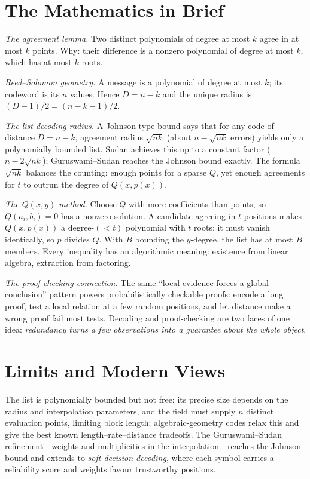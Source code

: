 \section{The Mathematics in Brief}

\emph{The agreement lemma.} Two distinct polynomials of degree at most $k$ agree in at most $k$ points. Why: their difference is a nonzero polynomial of degree at most $k$, which has at most $k$ roots.

\emph{Reed--Solomon geometry.} A message is a polynomial of degree at most $k$; its codeword is its $n$ values. Hence $D=n-k$ and the unique radius is $(D-1)/2=(n-k-1)/2$.

\emph{The list-decoding radius.} A Johnson-type bound says that for any code of distance $D=n-k$, agreement radius $\sqrt{nk}$ (about $n-\sqrt{nk}$ errors) yields only a polynomially bounded list. Sudan achieves this up to a constant factor ($n-2\sqrt{nk}$); Guruswami--Sudan reaches the Johnson bound exactly. The formula $\sqrt{nk}$ balances the counting: enough points for a sparse $Q$, yet enough agreements for $t$ to outrun the degree of $Q(x,p(x))$.

\emph{The $Q(x,y)$ method.} Choose $Q$ with more coefficients than points, so $Q(a_i,b_i)=0$ has a nonzero solution. A candidate agreeing in $t$ positions makes $Q(x,p(x))$ a degree-$(<t)$ polynomial with $t$ roots; it must vanish identically, so $p$ divides $Q$. With $B$ bounding the $y$-degree, the list has at most $B$ members. Every inequality has an algorithmic meaning: existence from linear algebra, extraction from factoring.

\emph{The proof-checking connection.} The same ``local evidence forces a global conclusion'' pattern powers probabilistically checkable proofs: encode a long proof, test a local relation at a few random positions, and let distance make a wrong proof fail most tests. Decoding and proof-checking are two faces of one idea: \emph{redundancy turns a few observations into a guarantee about the whole object}.

\section{Limits and Modern Views}

The list is polynomially bounded but not free: its precise size depends on the radius and interpolation parameters, and the field must supply $n$ distinct evaluation points, limiting block length; algebraic-geometry codes relax this and give the best known length--rate--distance tradeoffs. The Guruswami--Sudan refinement---weights and multiplicities in the interpolation---reaches the Johnson bound and extends to \emph{soft-decision decoding}, where each symbol carries a reliability score and weights favour trustworthy positions.

